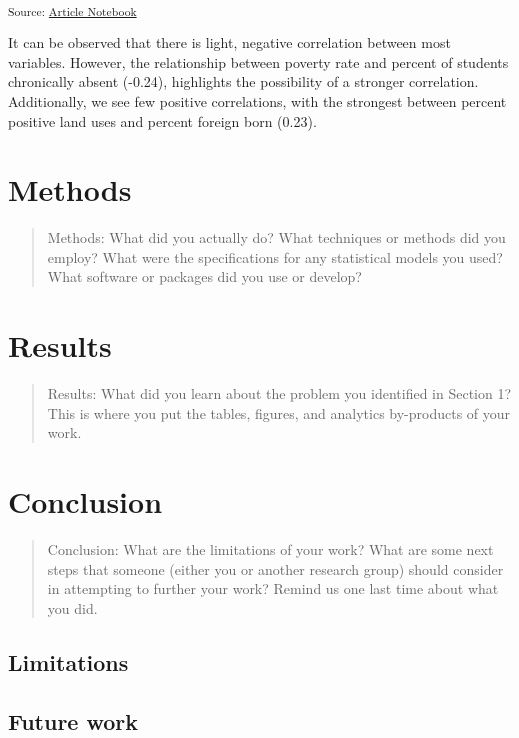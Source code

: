 \documentclass[
  letterpaper,
  DIV=11,
  numbers=noendperiod]{scrartcl}
\begin{document}
\textsubscript{Source:
\href{https://sds-capstone.github.io/dced-f26/index.qmd.html}{Article
Notebook}}

It can be observed that there is light, negative correlation between
most variables. However, the relationship between poverty rate and
percent of students chronically absent (-0.24), highlights the
possibility of a stronger correlation. Additionally, we see few positive
correlations, with the strongest between percent positive land uses and
percent foreign born (0.23).

\section{Methods}\label{sec-methods}

\begin{quote}
Methods: What did you actually do? What techniques or methods did you
employ? What were the specifications for any statistical models you
used? What software or packages did you use or develop?
\end{quote}

\section{Results}\label{results}

\begin{quote}
Results: What did you learn about the problem you identified in Section
1? This is where you put the tables, figures, and analytics by-products
of your work.
\end{quote}

\section{Conclusion}\label{conclusion}

\begin{quote}
Conclusion: What are the limitations of your work? What are some next
steps that someone (either you or another research group) should
consider in attempting to further your work? Remind us one last time
about what you did.
\end{quote}

\subsection{Limitations}\label{limitations}

\subsection{Future work}\label{future-work}
\end{document}
